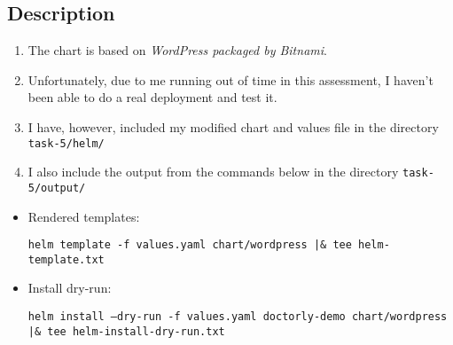 \documentclass[oneside,titlepage,fleqn,a4paper]{article}
\begin{document}
\subsection{Description}
\begin{enumerate}
\item The chart is based on \emph{WordPress packaged by Bitnami}.
\item Unfortunately, due to me running out of time in this assessment, I haven't been able to do a real deployment and test it.
\item I have, however, included my modified chart and values file in the directory \texttt{task-5/helm/}
\item I also include the output from the commands below in the directory \texttt{task-5/output/}
\end{enumerate}
\begin{itemize}
\item Rendered templates: \\
\begin{scriptsize}
\texttt{helm template -f values.yaml chart/wordpress |\& tee helm-template.txt}
\end{scriptsize}
\item Install dry-run: \\
\begin{scriptsize}
\texttt{helm install --dry-run -f values.yaml doctorly-demo chart/wordpress |\& tee helm-install-dry-run.txt}
\end{scriptsize}
\end{itemize}

\end{document}
